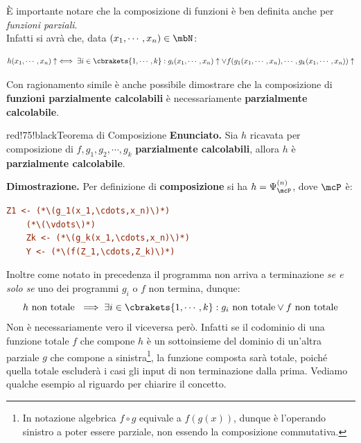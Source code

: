 È importante notare che la composizione di funzioni è ben definita anche per \textit{funzioni parziali}. \\
Infatti si avrà che, data \((x_1,\cdots,x_n) \in \mbN\):

\begin{equation}
  h(x_1,\cdots,x_n)\uparrow \iff \exists i \in \cbrakets{1,\cdots,k}: g_i(x_1,\cdots,x_n)\uparrow \vee f(g_1(x_1,\cdots,x_n),\cdots,g_k(x_1,\cdots,x_n))\uparrow
\end{equation}

Con ragionamento simile è anche possibile dimostrare che la composizione di \textbf{funzioni parzialmente calcolabili} è necessariamente \textbf{parzialmente calcolabile}.

\newpage

\begin{halfframedbox}{red!75!black}{Teorema di Composizione}\label{Composizione Teorema}
  \textbf{Enunciato.} Sia \(h\) ricavata per composizione di \(f, g_1, g_2, \cdots,g_k\) \textbf{parzialmente calcolabili}, allora \(h\) è \textbf{parzialmente calcolabile}.

  \begin{center}
    \textcolor{red!75!black}{\hdashrule[0.5ex]{18cm}{1pt}{3mm 3pt 1mm 2pt}}
  \end{center}

  \textbf{Dimostrazione.} Per definizione di \textbf{composizione} si ha \(h=\Psi_{\mcP}^{(n)}\), dove \(\mcP\) è:
  \begin{lstlisting}[language=ini, label={Teorema compozione},  caption=Dimostrazione Teorema di Composizione]
    Z1 <- (*\(g_1(x_1,\cdots,x_n)\)*)
    (*\(\vdots\)*)
    Zk <- (*\(g_k(x_1,\cdots,x_n)\)*)
    Y <- (*\(f(Z_1,\cdots,Z_k)\)*)
  \end{lstlisting}
\end{halfframedbox}

Inoltre come notato in precedenza il programma non arriva a terminazione \textit{se e solo se} uno dei programmi \(g_i\) o \(f\) non termina, dunque:
\begin{equation}
   h \text{ non totale } \implies \exists i \in \cbrakets{1,\cdots,k}: g_i \text{ non totale} \lor f \text{ non totale}
\end{equation}
Non è necessariamente vero il viceversa però. Infatti se il codominio di una funzione totale \(f\) che compone \(h\) è un sottoinsieme del dominio di un'altra parziale \(g\) che compone a sinistra\footnote{In notazione algebrica \(f \circ g\) equivale a \(f(g(x))\), dunque è l'operando sinistro a poter essere parziale, non essendo la composizione commutativa.},
la funzione composta sarà totale, poiché quella totale escluderà i casi gli input di non terminazione dalla prima.
Vediamo qualche esempio al riguardo per chiarire il concetto.

